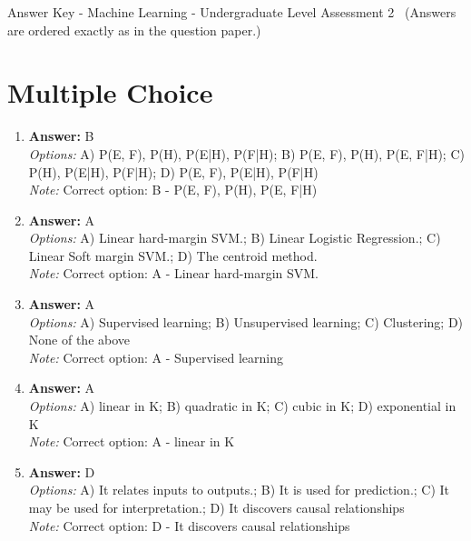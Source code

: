 \documentclass[12pt]{article}
\begin{document}
\begin{center}
Answer Key - Machine Learning - Undergraduate Level Assessment 2 \
\small (Answers are ordered exactly as in the question paper.)
\end{center}

\section*{Multiple Choice}
\begin{enumerate}[label=\arabic*.]
\item \textbf{Answer:} B
\\ \textit{Options:} A) P(E, F), P(H), P(E|H), P(F|H); B) P(E, F), P(H), P(E, F|H); C) P(H), P(E|H), P(F|H); D) P(E, F), P(E|H), P(F|H)
\\ \textit{Note:} Correct option: B - P(E, F), P(H), P(E, F|H)
\item \textbf{Answer:} A
\\ \textit{Options:} A) Linear hard-margin SVM.; B) Linear Logistic Regression.; C) Linear Soft margin SVM.; D) The centroid method.
\\ \textit{Note:} Correct option: A - Linear hard-margin SVM.
\item \textbf{Answer:} A
\\ \textit{Options:} A) Supervised learning; B) Unsupervised learning; C) Clustering; D) None of the above
\\ \textit{Note:} Correct option: A - Supervised learning
\item \textbf{Answer:} A
\\ \textit{Options:} A) linear in K; B) quadratic in K; C) cubic in K; D) exponential in K
\\ \textit{Note:} Correct option: A - linear in K
\item \textbf{Answer:} D
\\ \textit{Options:} A) It relates inputs to outputs.; B) It is used for prediction.; C) It may be used for interpretation.; D) It discovers causal relationships
\\ \textit{Note:} Correct option: D - It discovers causal relationships
\end{enumerate}
\end{document}
